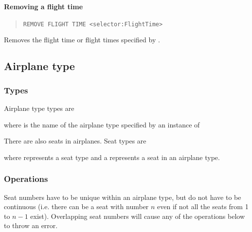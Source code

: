 \paragraph{Removing a flight time}
\begin{quote}
  \lstinline{REMOVE FLIGHT TIME <selector:FlightTime>}
\end{quote}
Removes the flight time or flight times specified by .


\subsection{Airplane type}
\subsubsection{Types}
Airplane type types are
\begin{description}
  \item[] 
  \item[] 
\end{description}
where  is the name of the airplane type specified by an instance of

There are also seats in airplanes. Seat types are
\begin{description}
  \item[] 
  \item[] 
  \item[] 
  \item[] 
\end{description}
where  represents a seat type and a  represents a seat in
an airplane type.

\subsubsection{Operations}
Seat numbers have to be unique within an airplane type, but do not have to be
continuous (i.e. there can be a seat with number $n$ even if not all the seats
from 1 to $n-1$ exist). Overlapping seat numbers will cause any of the
operations below to throw an error.


